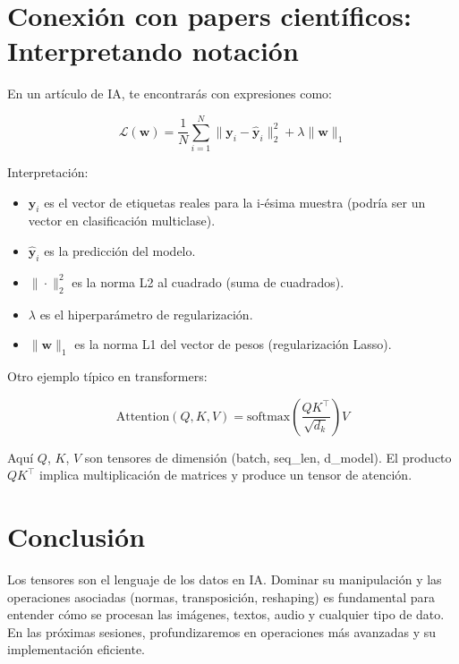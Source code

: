 \documentclass[12pt,a4paper,openany,oneside]{book}
\begin{document}
\section{Conexión con papers científicos: Interpretando notación}

En un artículo de IA, te encontrarás con expresiones como:

\begin{equation*}
\mathcal{L}(\mathbf{w}) = \frac{1}{N} \sum_{i=1}^{N} \| \mathbf{y}_i - \hat{\mathbf{y}}_i \|_2^2 + \lambda \| \mathbf{w} \|_1
\end{equation*}

Interpretación:
\begin{itemize}
    \item $\mathbf{y}_i$ es el vector de etiquetas reales para la i-ésima muestra (podría ser un vector en clasificación multiclase).
    \item $\hat{\mathbf{y}}_i$ es la predicción del modelo.
    \item $\| \cdot \|_2^2$ es la norma L2 al cuadrado (suma de cuadrados).
    \item $\lambda$ es el hiperparámetro de regularización.
    \item $\| \mathbf{w} \|_1$ es la norma L1 del vector de pesos (regularización Lasso).
\end{itemize}

Otro ejemplo típico en transformers:

\begin{equation*}
\text{Attention}(Q,K,V) = \text{softmax}\left( \frac{Q K^\top}{\sqrt{d_k}} \right) V
\end{equation*}

Aquí $Q$, $K$, $V$ son tensores de dimensión (batch, seq_len, d_model). El producto $QK^\top$ implica multiplicación de matrices y produce un tensor de atención.

\section{Conclusión}

Los tensores son el lenguaje de los datos en IA. Dominar su manipulación y las operaciones asociadas (normas, transposición, reshaping) es fundamental para entender cómo se procesan las imágenes, textos, audio y cualquier tipo de dato. En las próximas sesiones, profundizaremos en operaciones más avanzadas y su implementación eficiente.
\end{document}
